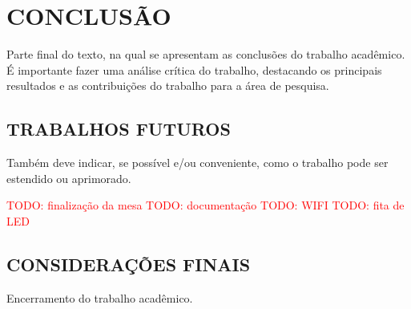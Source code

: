 
\chapter{CONCLUSÃO}
\label{chap:conclusao}

Parte final do texto, na qual se apresentam as conclusões do trabalho acadêmico. É importante fazer uma análise crítica do trabalho, destacando os principais resultados e as contribuições do trabalho para a área de pesquisa.

\section{TRABALHOS FUTUROS}
\label{sec:trabalhosFuturos}

Também deve indicar, se possível e/ou conveniente, como o trabalho pode ser estendido ou aprimorado.

\textcolor{red}{TODO: finalização da mesa}
\textcolor{red}{TODO: documentação}
\textcolor{red}{TODO: WIFI}
\textcolor{red}{TODO: fita de LED}

\section{CONSIDERAÇÕES FINAIS}
\label{sec:consideracoesFinais}

Encerramento do trabalho acadêmico.
